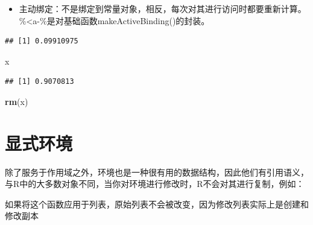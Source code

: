 \documentclass[]{book}
\newenvironment{Shaded}{\begin{snugshade}}{\end{snugshade}}
\newcommand{\KeywordTok}[1]{\textcolor[rgb]{0.13,0.29,0.53}{\textbf{#1}}}
\newcommand{\DecValTok}[1]{\textcolor[rgb]{0.00,0.00,0.81}{#1}}
\newcommand{\StringTok}[1]{\textcolor[rgb]{0.31,0.60,0.02}{#1}}
\newcommand{\ControlFlowTok}[1]{\textcolor[rgb]{0.13,0.29,0.53}{\textbf{#1}}}
\newcommand{\OperatorTok}[1]{\textcolor[rgb]{0.81,0.36,0.00}{\textbf{#1}}}
\newcommand{\NormalTok}[1]{#1}
\providecommand{\tightlist}{%
  \setlength{\itemsep}{0pt}\setlength{\parskip}{0pt}}
\begin{document}
\begin{itemize}
\tightlist
\item
  主动绑定：不是绑定到常量对象，相反，每次对其进行访问时都要重新计算。\%\textless{}a-\%是对基础函数makeActiveBinding()的封装。
\end{itemize}

\begin{Shaded}
\end{Shaded}

\begin{verbatim}
## [1] 0.09910975
\end{verbatim}

\begin{Shaded}
\begin{Highlighting}[]
\NormalTok{x}
\end{Highlighting}
\end{Shaded}

\begin{verbatim}
## [1] 0.9070813
\end{verbatim}

\begin{Shaded}
\begin{Highlighting}[]
\KeywordTok{rm}\NormalTok{(x)}
\end{Highlighting}
\end{Shaded}

\section{显式环境}

除了服务于作用域之外，环境也是一种很有用的数据结构，因此他们有引用语义，与R中的大多数对象不同，当你对环境进行修改时，R不会对其进行复制，例如：

\begin{Shaded}
\end{Shaded}

如果将这个函数应用于列表，原始列表不会被改变，因为修改列表实际上是创建和修改副本
\end{document}
